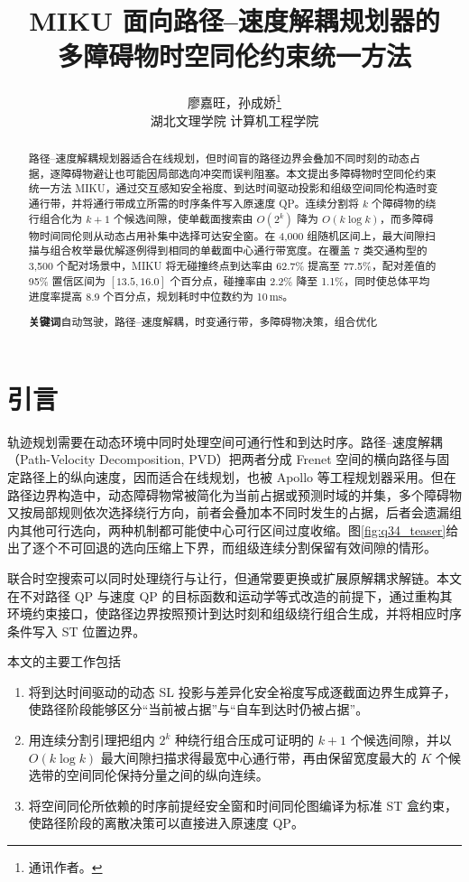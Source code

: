 \documentclass[a4paper,zihao=5]{ctexart}
\title{MIKU 面向路径--速度解耦规划器的\\多障碍物时空同伦约束统一方法}
\author{廖嘉旺，孙成娇\thanks{通讯作者。}\\[2pt]\normalsize 湖北文理学院 计算机工程学院}
\date{}
\theoremstyle{definition}
\begin{document}
\maketitle

\begin{abstract}
\small
\noindent
路径--速度解耦规划器适合在线规划，但时间盲的路径边界会叠加不同时刻的动态占据，逐障碍物避让也可能因局部选向冲突而误判阻塞。本文提出多障碍物时空同伦约束统一方法 MIKU，通过交互感知安全裕度、到达时间驱动投影和组级空间同伦构造时变通行带，并将通行带成立所需的时序条件写入原速度 QP。连续分割将 $k$ 个障碍物的绕行组合化为 $k+1$ 个候选间隙，使单截面搜索由 $O(2^k)$ 降为 $O(k\log k)$，而多障碍物时间同伦则从动态占用补集中选择可达安全窗。在 4,000 组随机区间上，最大间隙扫描与组合枚举最优解逐例得到相同的单截面中心通行带宽度。在覆盖 7 类交通构型的 3,500 个配对场景中，MIKU 将无碰撞终点到达率由 62.7\% 提高至 77.5\%，配对差值的 95\% 置信区间为 $[13.5,16.0]$ 个百分点，碰撞率由 2.2\% 降至 1.1\%，同时使总体平均进度率提高 8.9 个百分点，规划耗时中位数约为 10\,ms。

\vspace{0.5em}
\noindent\textbf{关键词}\quad 自动驾驶，路径--速度解耦，时变通行带，多障碍物决策，组合优化
\end{abstract}
\section{引言}
\label{sec:intro}

轨迹规划需要在动态环境中同时处理空间可通行性和到达时序。路径--速度解耦（Path-Velocity Decomposition, PVD）把两者分成 Frenet 空间的横向路径与固定路径上的纵向速度，因而适合在线规划\citep{kant1986pvd,werling2010,zhou2021dliaps}，也被 Apollo 等工程规划器采用\citep{fan2018baidu,apollo2024,zhou2021pathqp,wang2022_jfr}。但在路径边界构造中，动态障碍物常被简化为当前占据或预测时域的并集，多个障碍物又按局部规则依次选择绕行方向，前者会叠加本不同时发生的占据，后者会遗漏组内其他可行选向，两种机制都可能使中心可行区间过度收缩\citep{meng2019_access,gonzalez2016,paden2016}。图\ref{fig:q34_teaser}给出了逐个不可回退的选向压缩上下界，而组级连续分割保留有效间隙的情形。

联合时空搜索可以同时处理绕行与让行，但通常要更换或扩展原解耦求解链。本文在不对路径 QP 与速度 QP 的目标函数和运动学等式改造的前提下，通过重构其环境约束接口，使路径边界按照预计到达时刻和组级绕行组合生成，并将相应时序条件写入 ST 位置边界。

本文的主要工作包括
\begin{enumerate}[leftmargin=1.6em,itemsep=0.25em]
    \item 将到达时间驱动的动态 SL 投影与差异化安全裕度写成逐截面边界生成算子，使路径阶段能够区分“当前被占据”与“自车到达时仍被占据”。
    \item 用连续分割引理把组内 $2^k$ 种绕行组合压成可证明的 $k+1$ 个候选间隙，并以 $O(k\log k)$ 最大间隙扫描求得最宽中心通行带，再由保留宽度最大的 $K$ 个候选带的空间同伦保持分量之间的纵向连续。
    \item 将空间同伦所依赖的时序前提经安全窗和时间同伦图编译为标准 ST 盒约束，使路径阶段的离散决策可以直接进入原速度 QP。
\end{enumerate}
\end{document}
